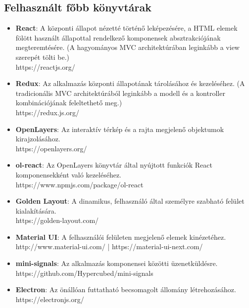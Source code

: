 \subsection{Felhasznált főbb könyvtárak}

\begin{itemize}
  \item \textbf{React}: A központi állapot nézetté történő leképezésére, a HTML
  elemek fölött használt állapottal rendelkező komponensek absztrakciójának
  megteremtésére. (A hagyományos MVC architektúrában leginkább a view szerepét
  tölti be.) \\
  https://reactjs.org/

  \item \textbf{Redux}: Az alkalmazás központi állapotának tárolásához és
  kezeléséhez. (A tradicionális MVC architektúrából leginkább a modell és a
  kontroller kombinációjának feleltethető meg.) \\
  https://redux.js.org/

  \item \textbf{OpenLayers}: Az interaktív térkép és a rajta megjelenő
  objektumok kirajzolásához. \\
  https://openlayers.org/

  \item \textbf{ol-react}: Az OpenLayers könyvtár által nyújtott funkciók React
  komponensekként való kezeléséhez. \\
  https://www.npmjs.com/package/ol-react

  \item \textbf{Golden Layout}: A dinamikus, felhasználó által személyre szabható
  felület kialakítására. \\
  https://golden-layout.com/

  \item \textbf{Material UI}: A felhasználói felületen megjelenő elemek
  kinézetéhez. \\
  http://www.material-ui.com/ | https://material-ui-next.com/

  \item \textbf{mini-signals}: Az alkalmazás komponensei közötti üzenetküldésre.
  \\
  https://github.com/Hypercubed/mini-signals

  \item \textbf{Electron}: Az önállóan futtatható becsomagolt állomány
  létrehozásához. \\
  https://electronjs.org/
\end{itemize}

